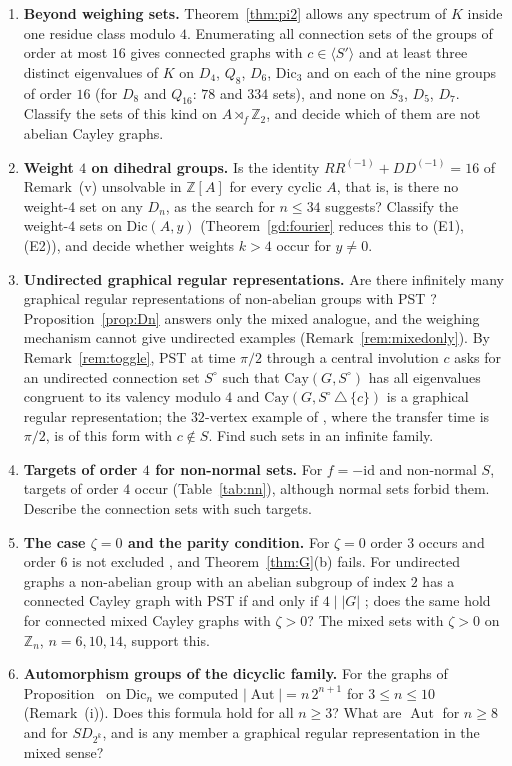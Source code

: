\documentclass[preprint,11pt]{elsarticle}
\makeatletter
\theoremstyle{definition}
\theoremstyle{remark}
\DeclareMathOperator{\Aut}{Aut}
\newcommand{\Z}{\mathbb Z}
\newcommand{\SR}[1]{\@nameuse{SR@#1}}
\makeatother
\begin{document}
\begin{enumerate}
\item \textbf{Beyond weighing sets.} Theorem~\ref{thm:pi2} allows any spectrum of $K$ inside one residue class modulo $4$. Enumerating all connection sets of the groups of order at most $16$ gives connected graphs with $c\in\langle S'\rangle$ and at least three distinct eigenvalues of $K$ on $D_4$, $Q_8$, $D_6$, $\mathrm{Dic}_3$ and on each of the nine groups of order $16$ (for $D_8$ and $Q_{16}$: $78$ and $334$ sets), and none on $S_3$, $D_5$, $D_7$. Classify the sets of this kind on $A\rtimes_f\Z_2$, and decide which of them are not abelian Cayley graphs.
\item \textbf{Weight $4$ on dihedral groups.} Is the identity $RR^{(-1)}+DD^{(-1)}=16$ of Remark~\SR{rem:kgen}(v) unsolvable in $\Z[A]$ for every cyclic $A$, that is, is there no weight-$4$ set on any $D_n$, as the search for $n\le34$ suggests? Classify the weight-$4$ sets on $\mathrm{Dic}(A,y)$ (Theorem~\ref{gd:fourier} reduces this to (E1), (E2)), and decide whether weights $k>4$ occur for $y\ne0$.
\item \textbf{Undirected graphical regular representations.} Are there infinitely many graphical regular representations of non-abelian groups with PST \cite[Problem~8.2]{AG}? Proposition~\ref{prop:Dn} answers only the mixed analogue, and the weighing mechanism cannot give undirected examples (Remark~\ref{rem:mixedonly}). By Remark~\ref{rem:toggle}, PST at time $\pi/2$ through a central involution $c$ asks for an undirected connection set $S^\circ$ such that $\mathrm{Cay}(G,S^\circ)$ has all eigenvalues congruent to its valency modulo $4$ and $\mathrm{Cay}(G,S^\circ\,\triangle\,\{c\})$ is a graphical regular representation; the $32$-vertex example of \cite[Section~6.1]{AG}, where the transfer time is $\pi/2$, is of this form with $c\notin S$. Find such sets in an infinite family.
\item \textbf{Targets of order $4$ for non-normal sets.} For $f=-\mathrm{id}$ and non-normal $S$, targets of order $4$ occur (Table~\ref{tab:nn}), although normal sets forbid them. Describe the connection sets with such targets.
\item \textbf{The case $\zeta=0$ and the parity condition.} For $\zeta=0$ order $3$ occurs and order $6$ is not excluded \cite{CPRS}, and Theorem~\ref{thm:G}(b) fails. For undirected graphs a non-abelian group with an abelian subgroup of index $2$ has a connected Cayley graph with PST if and only if $4\mid|G|$ \cite{AG}; does the same hold for connected mixed Cayley graphs with $\zeta>0$? The mixed sets with $\zeta>0$ on $\Z_n$, $n=6,10,14$, support this.
\item \textbf{Automorphism groups of the dicyclic family.} For the graphs of Proposition~\SR{prop:dic} on $\mathrm{Dic}_n$ we computed $|\Aut|=n\,2^{n+1}$ for $3\le n\le10$ (Remark~\SR{rem:dic}(i)). Does this formula hold for all $n\ge3$? What are $\Aut$ for $n\ge8$ and for $SD_{2^k}$, and is any member a graphical regular representation in the mixed sense?
\end{enumerate}
\end{document}
